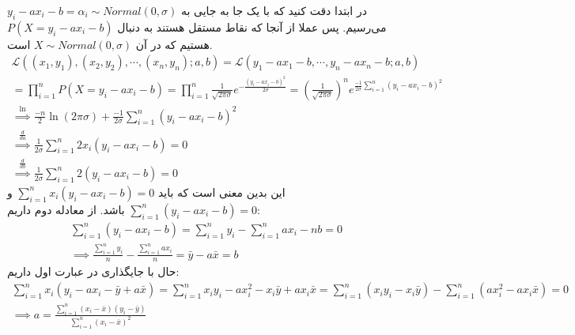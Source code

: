 در ابتدا دقت کنید که با یک جا به جایی به
$y_i - ax_i - b = \alpha_i \sim Normal(0, \sigma)$
می‌رسیم. پس عملا از آنجا که نقاط مستقل هستند به دنبال
$P(X = y_i - ax_i - b)$
هستیم که در آن
$X \sim Normal(0, \sigma)$
است.
\begin{gather*}
    \mathcal{L}((x_1,y_1), (x_2,y_2), \cdots, (x_n,y_n); a, b) = \mathcal{L}(y_1 - ax_1 - b, \cdots, y_n - ax_n - b; a, b)\\
    = \prod_{i=1}^n P(X = y_i - ax_i - b) = \prod_{i=1}^n \frac{1}{\sqrt{2 \pi \sigma}} e^{-\frac{(y_i - ax_i - b)^2}{2\sigma}} =
    (\frac{1}{\sqrt{2 \pi \sigma}})^n e^{\frac{-1}{2\sigma} \sum_{i=1}^n (y_i - ax_i - b)^2}\\
    \stackrel{\ln}{\implies} \frac{-n}{2}\ln(2 \pi \sigma) + \frac{-1}{2\sigma} \sum_{i=1}^n (y_i - ax_i - b)^2\\
    \stackrel{\frac{d}{d a}}{\implies} \frac{1}{2\sigma} \sum_{i=1}^n 2x_i (y_i - ax_i - b) = 0\\
    \stackrel{\frac{d}{d b}}{\implies} \frac{1}{2\sigma} \sum_{i=1}^n 2 (y_i - ax_i - b) = 0
\end{gather*}
این بدین معنی است که باید
$\sum_{i=1}^n x_i (y_i - ax_i - b) = 0$
و
$\sum_{i=1}^n (y_i - ax_i - b) = 0$
باشد. از معادله دوم داریم:
\begin{gather*}
    \sum_{i=1}^n (y_i - ax_i - b) = \sum_{i=1}^n y_i - \sum_{i=1}^n ax_i - nb = 0\\
    \implies \frac{\sum_{i=1}^n y_i}{n} - \frac{\sum_{i=1}^n ax_i}{n} = \bar{y} - a\bar{x} = b
\end{gather*}
حال با جایگذاری در عبارت اول داریم:
\begin{gather*}
    \sum_{i=1}^n x_i (y_i - ax_i - \bar{y} + a\bar{x}) = \sum_{i=1}^n x_i y_i - ax_i^2 - x_i\bar{y} + ax_i\bar{x}
    = \sum_{i=1}^n (x_i y_i - x_i\bar{y}) - \sum_{i=1}^n (ax_i^2 - ax_i\bar{x}) = 0\\
    \implies a = \frac{\sum_{i=1}^{n} (x_i-\bar{x})(y_i-\bar{y})}{\sum_{i=1}^n (x_i-\bar{x})^2}
\end{gather*}